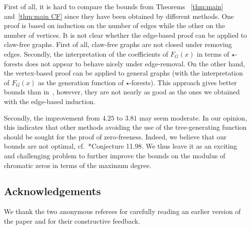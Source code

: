 \documentclass[a4paper,11pt,reqno]{amsart}
\numberwithin{equation}{section}
\begin{document}
First of all, it is hard to compare the bounds from Theorems~
\ref{thm:main} and~\ref{thm:main CF} since they have been obtained by different methods. One proof is based on induction on the number of edges while the other on the number of vertices. It is not clear whether the edge-based proof can be applied to claw-free graphs. First of all, claw-free graphs are not closed under removing edges.  Secondly, the interpretation of the coefficients of $F_G(x)$ in terms of $\star$-forests does not appear to behave nicely under edge-removal.
On the other hand, the vertex-based proof can be applied to general graphs (with the interpretation of $F_G(x)$ as the generation function of $\star$-forests). This approach gives better bounds than in~\cite{JPR24}, however, they are not nearly as good as the ones we obtained with the edge-based induction.

Secondly, the improvement from $4.25$ to $3.81$ may seem moderate. In our opinion, this indicates that other methods avoiding the use of the tree-generating function should be sought for the proof of zero-freeness. 
Indeed, we believe that our bounds are not optimal, cf.~\cite{dong2022foundations}*{Conjecture 11.98}.
We thus leave it as an exciting and challenging problem to further improve the bounds on the modulus of chromatic zeros in terms of the maximum degree.

\subsection*{Acknowledgements}
We thank the two anonymous referees for carefully reading an earlier version of the paper and for their constructive feedback.



\end{document}
